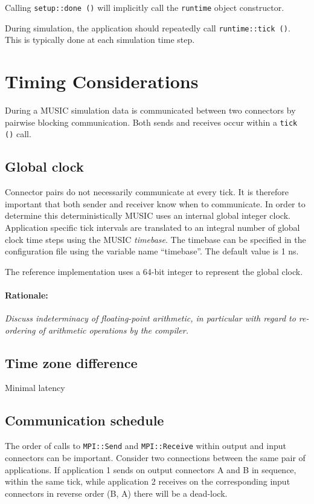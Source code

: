 \documentclass[a4paper]{report}
\newenvironment{rationale}%
{\par\paragraph{Rationale:}}%
{\par}
\begin{document}
\begin{metatext}
Calling \lstinline|setup::done ()| will implicitly call the
\lstinline|runtime| object constructor.

During simulation, the application should repeatedly call
\lstinline|runtime::tick ()|.  This is typically done at each simulation
time step.

\section{Timing Considerations}

During a MUSIC simulation data is communicated between two connectors
by pairwise blocking communication.  Both sends and receives occur
within a \lstinline|tick ()| call.

\subsection{Global clock}

Connector pairs do not necessarily communicate at every tick.  It is
therefore important that both sender and receiver know when to
communicate.  In order to determine this deterministically MUSIC uses
an internal global integer clock.  Application specific tick intervals
are translated to an integral number of global clock time steps using
the MUSIC \emph{timebase}.  The timebase can be specified in the
configuration file using the variable name ``timebase''.  The default
value is 1 ns.

The reference implementation uses a 64-bit integer to represent the
global clock.

\begin{rationale}
  \emph{Discuss indeterminacy of floating-point arithmetic, in particular
    with regard to re-ordering of arithmetic operations by the compiler.}
\end{rationale}

\subsection{Time zone difference}

Minimal latency

\subsection{Communication schedule}

The order of calls to \lstinline|MPI::Send| and \lstinline|MPI::Receive| within
output and input connectors can be important.  Consider two
connections between the same pair of applications.  If application 1
sends on output connectors A and B in sequence, within the same tick,
while application 2 receives on the corresponding input connectors in
reverse order (B, A) there will be a dead-lock.


\end{metatext}
\end{document}
